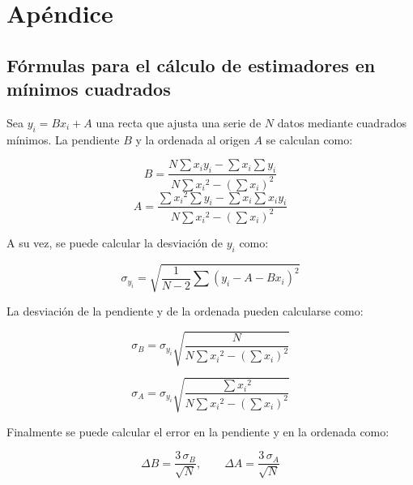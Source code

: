 \section{Apéndice}
\label{sec:apendice}



\subsection{Fórmulas para el cálculo de estimadores en mínimos cuadrados}
\label{sec:apendice:formulas-estimadores-mc}

Sea $y_i = Bx_i + A$ una recta que ajusta una serie de $N$ datos mediante
cuadrados mínimos. La pendiente $B$ y la ordenada al origen $A$ se calculan
como:

\newcommand{\denominador}{N \sum {x_i}^2 - \left( \sum x_i \right)^2} 

\begin{equation}
    \label{ec:apendice:pendiente-mc}
    B = \frac{ N \sum x_i y_i - \sum x_i \sum y_i }
             { \denominador }
\end{equation}
\vspace{5mm}
\begin{equation}
    \label{ec:apendice:ordenada-mc}
    A = \frac{ \sum {x_i}^2 \sum y_i - \sum x_i \sum x_i y_i}
             { \denominador }
\end{equation}
\vspace{5mm}

A su vez, se puede calcular la desviación de $y_i$ como:

\begin{equation}
    \label{ec:apendice:desviacion-y-mc}
    \sigma_{y_i} = \sqrt{ \frac{1}{N-2} \sum 
                          \left( y_i - A - B x_i \right)^2 }
\end{equation}

\vspace{5mm}
La desviación de la pendiente y de la ordenada pueden calcularse como:

\begin{equation}
    \label{ec:apendice:desviacion-pendiente-mc}
    \sigma_B = \sigma_{y_i} \sqrt { \frac{N}{\denominador} }
\end{equation}

\vspace{5mm}
\begin{equation}
    \label{ec:apendice:desviacion-ordenada-mc}
    \sigma_A = \sigma_{y_i} \sqrt { \frac{ \sum {x_i}^2 }{ \denominador } }
\end{equation}

\vspace{5mm}
Finalmente se puede calcular el error en la pendiente y en la ordenada como:

\begin{equation}
    \label{ec:apendice:errores-mc}
    \Delta B = \frac{3\,\sigma_B}{\sqrt{N}}, \quad\quad
    \Delta A = \frac{3\,\sigma_A}{\sqrt{N}}
\end{equation}
